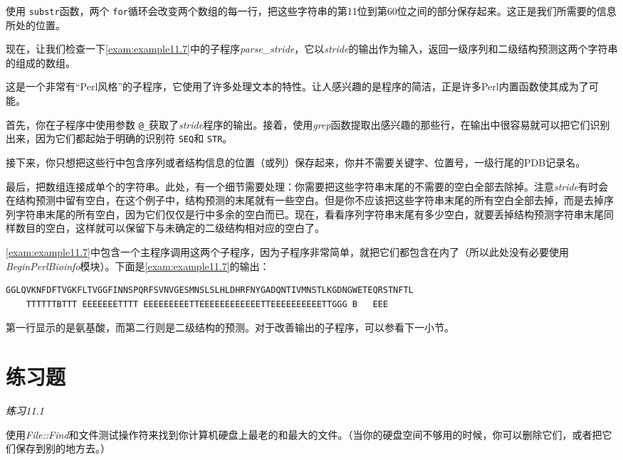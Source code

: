 使用 \verb|substr|函数，两个 \verb|for|循环会改变两个数组的每一行，把这些字符串的第11位到第60位之间的部分保存起来。这正是我们所需要的信息所处的位置。

现在，让我们检查一下\autoref{exam:example11.7}中的子程序\textit{parse\_stride}，它以\textit{stride}的输出作为输入，返回一级序列和二级结构预测这两个字符串的组成的数组。

这是一个非常有“Perl风格”的子程序，它使用了许多处理文本的特性。让人感兴趣的是程序的简洁，正是许多Perl内置函数使其成为了可能。

首先，你在子程序中使用参数 \verb|@_|获取了\textit{stride}程序的输出。接着，使用\textit{grep}函数提取出感兴趣的那些行，在输出中很容易就可以把它们识别出来，因为它们都起始于明确的识别符 \verb|SEQ|和 \verb|STR|。

接下来，你只想把这些行中包含序列或者结构信息的位置（或列）保存起来，你并不需要关键字、位置号，一级行尾的PDB记录名。

最后，把数组连接成单个的字符串。此处，有一个细节需要处理：你需要把这些字符串末尾的不需要的空白全部去除掉。注意\textit{stride}有时会在结构预测中留有空白，在这个例子中，结构预测的末尾就有一些空白。但是你不应该把这些字符串末尾的所有空白全部去掉，而是去掉序列字符串末尾的所有空白，因为它们仅仅是行中多余的空白而已。现在，看看序列字符串末尾有多少空白，就要丢掉结构预测字符串末尾同样数目的空白，这样就可以保留下与未确定的二级结构相对应的空白了。

\autoref{exam:example11.7}中包含一个主程序调用这两个子程序，因为子程序非常简单，就把它们都包含在内了（所以此处没有必要使用\textit{BeginPerlBioinfo}模块）。下面是\autoref{exam:example11.7}的输出： 

\begin{lstlisting}
GGLQVKNFDFTVGKFLTVGGFINNSPQRFSVNVGESMNSLSLHLDHRFNYGADQNTIVMNSTLKGDNGWETEQRSTNFTL
    TTTTTTBTTT EEEEEEETTTT EEEEEEEEETTEEEEEEEEEEEETTEEEEEEEEEETTGGG B   EEE     
\end{lstlisting}

第一行显示的是氨基酸，而第二行则是二级结构的预测。对于改善输出的子程序，可以参看下一小节。

\section{练习题}
\textcolor{black}{\textit{练习11.1}}
\begin{adjustwidth}{4em}{}
使用\textit{File::Find}和文件测试操作符来找到你计算机硬盘上最老的和最大的文件。（当你的硬盘空间不够用的时候，你可以删除它们，或者把它们保存到别的地方去。）
\end{adjustwidth}

